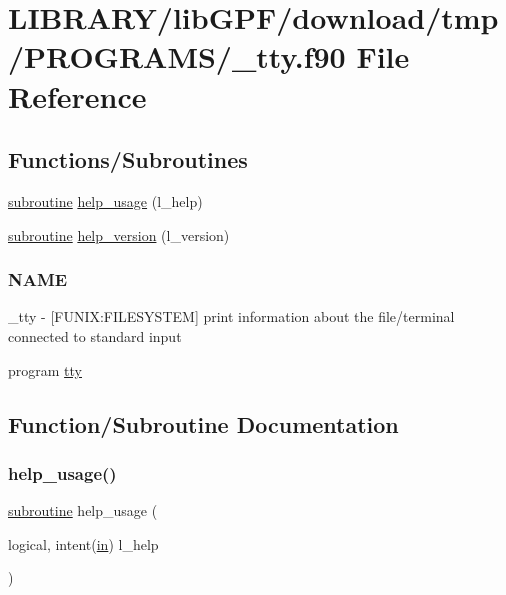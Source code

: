 \hypertarget{__tty_8f90}{}\section{L\+I\+B\+R\+A\+R\+Y/lib\+G\+P\+F/download/tmp/\+P\+R\+O\+G\+R\+A\+M\+S/\+\_\+tty.f90 File Reference}
\label{__tty_8f90}
\subsection*{Functions/\+Subroutines}
\begin{DoxyCompactItemize}
\item 
\hyperlink{M__stopwatch_83_8txt_acfbcff50169d691ff02d4a123ed70482}{subroutine} \hyperlink{__tty_8f90_a3e09a3b52ee8fb04eeb93fe5761626a8}{help\+\_\+usage} (l\+\_\+help)
\item 
\hyperlink{M__stopwatch_83_8txt_acfbcff50169d691ff02d4a123ed70482}{subroutine} \hyperlink{__tty_8f90_a39c21619b08a3c22f19e2306efd7f766}{help\+\_\+version} (l\+\_\+version)
\begin{DoxyCompactList}\small\item\em \subsubsection*{N\+A\+ME}

\+\_\+tty -\/ \mbox{[}F\+U\+N\+IX\+:F\+I\+L\+E\+S\+Y\+S\+T\+EM\mbox{]} print information about the file/terminal connected to standard input \end{DoxyCompactList}\item 
program \hyperlink{__tty_8f90_a860b0e8d8a94aa5cc835f634fdff3bd8}{tty}
\end{DoxyCompactItemize}


\subsection{Function/\+Subroutine Documentation}
\mbox{\label{__tty_8f90_a3e09a3b52ee8fb04eeb93fe5761626a8}} 
\subsubsection{\texorpdfstring{help\+\_\+usage()}{help\_usage()}}
{\footnotesize\ttfamily \hyperlink{M__stopwatch_83_8txt_acfbcff50169d691ff02d4a123ed70482}{subroutine} help\+\_\+usage (\begin{DoxyParamCaption}\item[{logical, intent(\hyperlink{M__journal_83_8txt_afce72651d1eed785a2132bee863b2f38}{in})}]{l\+\_\+help }\end{DoxyParamCaption})}



